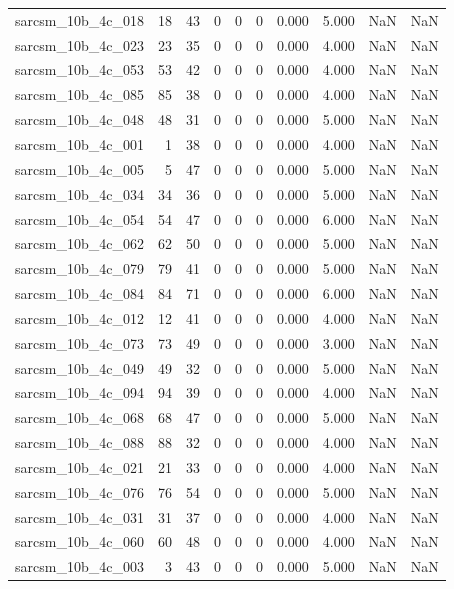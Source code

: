 \documentclass{article}
\begin{document}
\begin{longtable}{lrrrrrrrrr}
sarcsm\_10b\_4c\_018 & 18 & 43 & 0 & 0 & 0 & 0.000 & 5.000 & NaN & NaN \\
sarcsm\_10b\_4c\_023 & 23 & 35 & 0 & 0 & 0 & 0.000 & 4.000 & NaN & NaN \\
sarcsm\_10b\_4c\_053 & 53 & 42 & 0 & 0 & 0 & 0.000 & 4.000 & NaN & NaN \\
sarcsm\_10b\_4c\_085 & 85 & 38 & 0 & 0 & 0 & 0.000 & 4.000 & NaN & NaN \\
sarcsm\_10b\_4c\_048 & 48 & 31 & 0 & 0 & 0 & 0.000 & 5.000 & NaN & NaN \\
sarcsm\_10b\_4c\_001 & 1 & 38 & 0 & 0 & 0 & 0.000 & 4.000 & NaN & NaN \\
sarcsm\_10b\_4c\_005 & 5 & 47 & 0 & 0 & 0 & 0.000 & 5.000 & NaN & NaN \\
sarcsm\_10b\_4c\_034 & 34 & 36 & 0 & 0 & 0 & 0.000 & 5.000 & NaN & NaN \\
sarcsm\_10b\_4c\_054 & 54 & 47 & 0 & 0 & 0 & 0.000 & 6.000 & NaN & NaN \\
sarcsm\_10b\_4c\_062 & 62 & 50 & 0 & 0 & 0 & 0.000 & 5.000 & NaN & NaN \\
sarcsm\_10b\_4c\_079 & 79 & 41 & 0 & 0 & 0 & 0.000 & 5.000 & NaN & NaN \\
sarcsm\_10b\_4c\_084 & 84 & 71 & 0 & 0 & 0 & 0.000 & 6.000 & NaN & NaN \\
sarcsm\_10b\_4c\_012 & 12 & 41 & 0 & 0 & 0 & 0.000 & 4.000 & NaN & NaN \\
sarcsm\_10b\_4c\_073 & 73 & 49 & 0 & 0 & 0 & 0.000 & 3.000 & NaN & NaN \\
sarcsm\_10b\_4c\_049 & 49 & 32 & 0 & 0 & 0 & 0.000 & 5.000 & NaN & NaN \\
sarcsm\_10b\_4c\_094 & 94 & 39 & 0 & 0 & 0 & 0.000 & 4.000 & NaN & NaN \\
sarcsm\_10b\_4c\_068 & 68 & 47 & 0 & 0 & 0 & 0.000 & 5.000 & NaN & NaN \\
sarcsm\_10b\_4c\_088 & 88 & 32 & 0 & 0 & 0 & 0.000 & 4.000 & NaN & NaN \\
sarcsm\_10b\_4c\_021 & 21 & 33 & 0 & 0 & 0 & 0.000 & 4.000 & NaN & NaN \\
sarcsm\_10b\_4c\_076 & 76 & 54 & 0 & 0 & 0 & 0.000 & 5.000 & NaN & NaN \\
sarcsm\_10b\_4c\_031 & 31 & 37 & 0 & 0 & 0 & 0.000 & 4.000 & NaN & NaN \\
sarcsm\_10b\_4c\_060 & 60 & 48 & 0 & 0 & 0 & 0.000 & 4.000 & NaN & NaN \\
sarcsm\_10b\_4c\_003 & 3 & 43 & 0 & 0 & 0 & 0.000 & 5.000 & NaN & NaN \\

\end{longtable}
\end{document}

